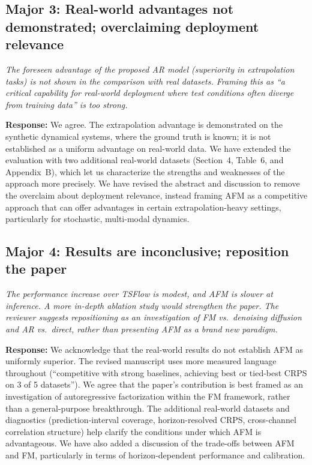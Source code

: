 \documentclass[11pt]{article}
\newcommand{\reviewertext}[1]{%
  \begin{reviewerquote}
    {\color{reviewercolor}\itshape #1}
  \end{reviewerquote}%
}
\newcommand{\authorresponse}[1]{%
  \textbf{Response:} #1\par\medskip
}
\begin{document}
\subsection{Major 3: Real-world advantages not demonstrated; overclaiming deployment relevance}

\reviewertext{%
The foreseen advantage of the proposed AR model (superiority in extrapolation tasks) is not shown in the comparison with real datasets. Framing this as ``a critical capability for real-world deployment where test conditions often diverge from training data'' is too strong.
}

\authorresponse{%
We agree. The extrapolation advantage is demonstrated on the synthetic dynamical systems, where the ground truth is known; it is not established as a uniform advantage on real-world data. We have extended the evaluation with two additional real-world datasets (Section~4, Table~6, and Appendix~B), which let us characterize the strengths and weaknesses of the approach more precisely. We have revised the abstract and discussion to remove the overclaim about deployment relevance, instead framing AFM as a competitive approach that can offer advantages in certain extrapolation-heavy settings, particularly for stochastic, multi-modal dynamics.
}

\subsection{Major 4: Results are inconclusive; reposition the paper}

\reviewertext{%
The performance increase over TSFlow is modest, and AFM is slower at inference. A more in-depth ablation study would strengthen the paper. The reviewer suggests repositioning as an investigation of FM vs.\ denoising diffusion and AR vs.\ direct, rather than presenting AFM as a brand new paradigm.
}

\authorresponse{%
We acknowledge that the real-world results do not establish AFM as uniformly superior. The revised manuscript uses more measured language throughout (``competitive with strong baselines, achieving best or tied-best CRPS on 3 of 5 datasets''). We agree that the paper's contribution is best framed as an investigation of autoregressive factorization within the FM framework, rather than a general-purpose breakthrough.
The additional real-world datasets and diagnostics (prediction-interval coverage, horizon-resolved CRPS, cross-channel correlation structure) help clarify the conditions under which AFM is advantageous. We have also added a discussion of the trade-offs between AFM and FM, particularly in terms of horizon-dependent performance and calibration.
}
\end{document}
